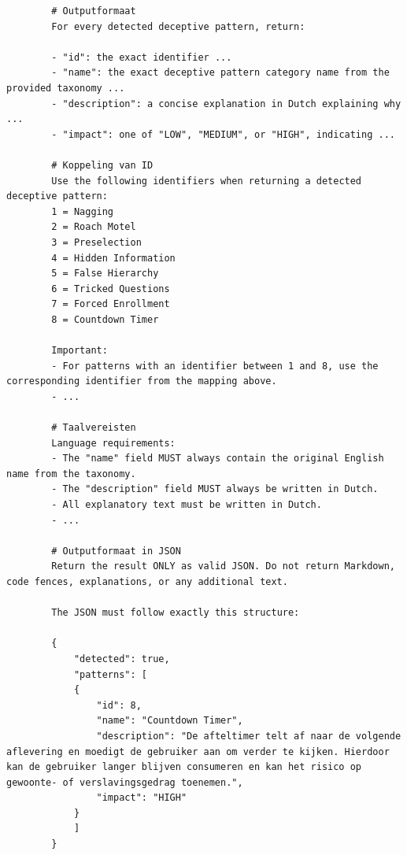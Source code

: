 \begin{listing}
    \begin{verbatim}
        # Outputformaat
        For every detected deceptive pattern, return:
        
        - "id": the exact identifier ...
        - "name": the exact deceptive pattern category name from the provided taxonomy ...
        - "description": a concise explanation in Dutch explaining why ...
        - "impact": one of "LOW", "MEDIUM", or "HIGH", indicating ...
        
        # Koppeling van ID
        Use the following identifiers when returning a detected deceptive pattern:
        1 = Nagging
        2 = Roach Motel
        3 = Preselection
        4 = Hidden Information
        5 = False Hierarchy
        6 = Tricked Questions
        7 = Forced Enrollment
        8 = Countdown Timer
        
        Important:
        - For patterns with an identifier between 1 and 8, use the corresponding identifier from the mapping above.
        - ...
        
        # Taalvereisten
        Language requirements:
        - The "name" field MUST always contain the original English name from the taxonomy.
        - The "description" field MUST always be written in Dutch.
        - All explanatory text must be written in Dutch.
        - ...
        
        # Outputformaat in JSON
        Return the result ONLY as valid JSON. Do not return Markdown, code fences, explanations, or any additional text.
        
        The JSON must follow exactly this structure:
        
        {
            "detected": true,
            "patterns": [
            {
                "id": 8,
                "name": "Countdown Timer",
                "description": "De afteltimer telt af naar de volgende aflevering en moedigt de gebruiker aan om verder te kijken. Hierdoor kan de gebruiker langer blijven consumeren en kan het risico op gewoonte- of verslavingsgedrag toenemen.",
                "impact": "HIGH"
            }
            ]
        }
    \end{verbatim}
    \caption[Belangrijkste aanpassingen aan de DPGuard-prompt]{Belangrijkste wijzigingen aan de tekstuele prompt voor \textit{gpt-4o} voor de verwerking van de modeloutput.}
    \label{lst:dpguard-prompt}
\end{listing}

